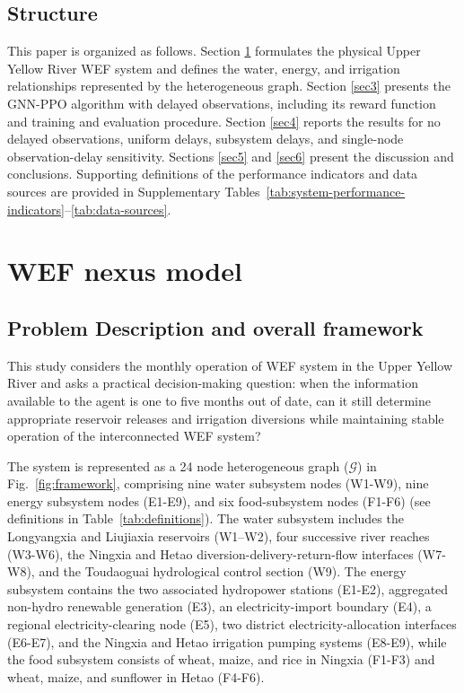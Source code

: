 \documentclass [a4paper,fleqn] {cas-dc}
\begin{document}
\subsection{Structure} \label{sec13}
This paper is organized as follows. Section \ref{sec2} formulates the physical Upper Yellow River WEF system and defines the water, energy, and irrigation relationships represented by the heterogeneous graph. Section \ref{sec3} presents the GNN-PPO algorithm with delayed observations, including its reward function and training and evaluation procedure. Section \ref{sec4} reports the results for no delayed observations, uniform delays, subsystem delays, and single-node observation-delay sensitivity. Sections \ref{sec5} and \ref{sec6} present the discussion and conclusions. Supporting definitions of the performance indicators and data sources are provided in Supplementary Tables~\ref{tab:system-performance-indicators}--\ref{tab:data-sources}.



\section{WEF nexus model} \label{sec2}

\subsection{Problem Description and overall framework}

\label{sec21}
This study considers the monthly operation of WEF system in the Upper Yellow River and asks a practical decision-making question: when the information available to the agent is one to five months out of date, can it still determine appropriate reservoir releases and irrigation diversions while maintaining stable operation of the interconnected WEF system? 

The system is represented as a 24 node heterogeneous graph ($\mathcal{G}$) in Fig.~\ref{fig:framework}, comprising nine water subsystem nodes (W1-W9), nine energy subsystem nodes (E1-E9), and six food-subsystem nodes (F1-F6) (see definitions in Table~\ref{tab:definitions}). The water subsystem includes the Longyangxia and Liujiaxia reservoirs (W1--W2), four successive river reaches (W3-W6), the Ningxia and Hetao diversion-delivery-return-flow interfaces (W7-W8), and the Toudaoguai hydrological control section (W9). The energy subsystem contains the two associated hydropower stations (E1-E2), aggregated non-hydro renewable generation (E3), an electricity-import boundary (E4), a regional electricity-clearing node (E5), two district electricity-allocation interfaces (E6-E7), and the Ningxia and Hetao irrigation pumping systems (E8-E9), while the food subsystem consists of wheat, maize, and rice in Ningxia (F1-F3) and wheat, maize, and sunflower in Hetao (F4-F6).
\end{document}
